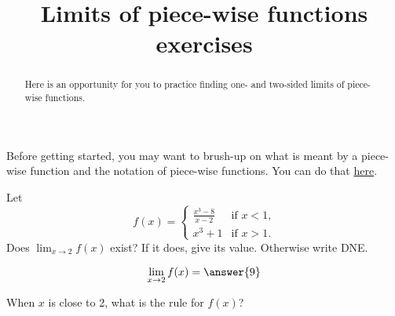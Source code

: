 \documentclass[handout]{ximera}
\title[Exercises:]{Limits of piece-wise functions exercises}
\begin{document}
\begin{abstract}
Here is an opportunity for you to practice finding one- and two-sided limits of piece-wise functions.
\end{abstract}
\maketitle

Before getting started, you may want to brush-up on what is meant by a piece-wise function and the notation of piece-wise functions.  You can do that \href{https://ximera.osu.edu/math160fa17/m160prerequisites/PreRequisiteXards/U2CommonFunctions/2.4PieceWiseFunctions/titlePage}{here}.

\begin{exercise}
Let
\[
f(x) = \begin{cases}
  \frac{x^3 - 8}{x-2}  &\text{if $x<1$,} \\
  x^3+1 &\text{if  $x>1$.}
\end{cases}
\]
Does $\displaystyle\lim_{x \to 2} f(x)$ exist?  If it does, give its value.
Otherwise write DNE.

\[
\lim_{x \to 2} f(x) = \answer{9}
\]

\begin{hint}
When $x$ is close to 2, what is the rule for $f(x)$?
\end{hint}

\end{exercise}
\end{document}
